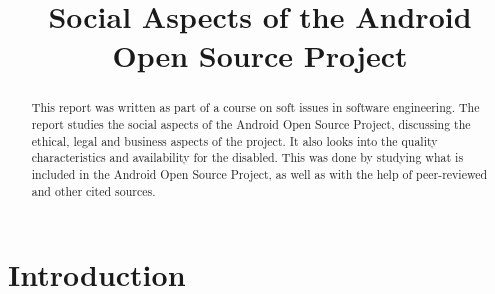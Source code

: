 \documentclass[conference]{IEEEtran}
\begin{document}
\title{Social Aspects of the Android Open Source Project}

\author{
{}
}


\maketitle


\begin{abstract}

This report was written as part of a course on soft issues in software engineering. The report studies the social aspects of the Android Open Source Project, discussing the ethical, legal and business aspects of the project. It also looks into the quality characteristics and availability for the disabled. This was done by studying what is included in the Android Open Source Project, as well as with the help of peer-reviewed and other cited sources. 


\end{abstract}


\section{Introduction}
\label{intro}
\end{document}
